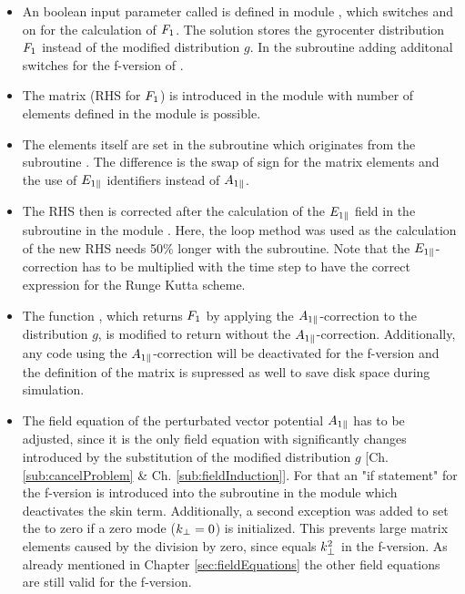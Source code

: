 \begin{itemize}
    \item An boolean input parameter called  is defined in module , which switches  and  on for the calculation of $F_1$. The solution  stores the gyrocenter distribution $F_1$ instead of the modified distribution $g$. In the subroutine  adding additonal switches for the f-version of {\gkw}.
    \item The matrix  (RHS for $F_1$) is introduced in the module  with  number of elements defined in the module  is possible.
    \item The elements itself are set in the subroutine  which originates from the subroutine . The difference is the swap of sign for the matrix elements and the use of $E_{1\parallel}$ identifiers instead of $A_{1\parallel}$.
    \item The RHS then is corrected after the calculation of the $E_{1\parallel}$ field in the subroutine  in the module . Here, the loop method was used as the calculation of the new RHS needs 50\% longer with the  subroutine. Note that the $E_{1\parallel}$-correction has to be multiplied with the time step  to have the correct expression for the Runge Kutta scheme.
    \item The function , which returns $F_1$ by applying the $A_{1\parallel}$-correction to the distribution $g$, is modified to return  without the $A_{1\parallel}$-correction. Additionally, any code using the $A_{1\parallel}$-correction will be deactivated for the f-version and the definition of the matrix  is supressed as well to save disk space during simulation.
    \item The field equation of the perturbated vector potential $A_{1\parallel}$ has to be adjusted, since it is the only field equation with significantly changes introduced by the substitution of the modified distribution $g$ [Ch. \ref{sub:cancelProblem} \& Ch. \ref{sub:fieldInduction}]. For that an "if statement" for the f-version is introduced into the subroutine  in the module  which deactivates the skin term. Additionally, a second exception was added to set the  to zero if a zero mode ($k_\perp = 0$) is initialized. This prevents large matrix elements caused by the division by zero, since  equals $k_\perp^2$ in the f-version. As already mentioned in Chapter \ref{sec:fieldEquations} the other field equations are still valid for the f-version.
\end{itemize}

